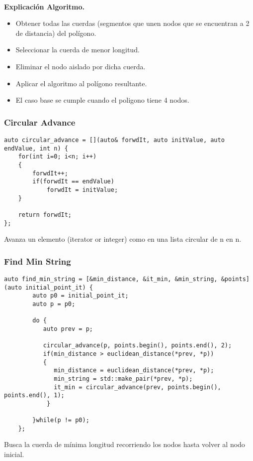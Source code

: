 \documentclass[compress]{beamer}
\begin{document}
\begin{frame}
	
	\textbf{\\Explicación Algoritmo.\\}
\begin{itemize}
	\item Obtener todas las cuerdas (segmentos que unen nodos que se encuentran a 2 de distancia) del polígono.
	\item Seleccionar la cuerda de menor longitud.
	\item Eliminar el nodo aislado por dicha cuerda.
	\item Aplicar el algoritmo al polígono resultante.
	
	\item El caso base se cumple cuando el poligono tiene 4 nodos.
\end{itemize}

\end{frame}	

\begin{frame}[fragile]
	\frametitle{Circular Advance}
 \begin{lstlisting}
auto circular_advance = [](auto& forwdIt, auto initValue, auto endValue, int n) {
	for(int i=0; i<n; i++)
	{
		forwdIt++;
		if(forwdIt == endValue)
			forwdIt = initValue;
	}

	return forwdIt;
};
 \end{lstlisting}
 
 Avanza un elemento (iterator or integer) como en una lista circular de n en n.
 
\end{frame}

\begin{frame}[fragile]
	\frametitle{Find Min String}
\begin{lstlisting}[basicstyle= \tiny,]
    auto find_min_string = [&min_distance, &it_min, &min_string, &points](auto initial_point_it) {
	    auto p0 = initial_point_it;
	    auto p = p0;
    
	    do {
		   auto prev = p;
    
		   circular_advance(p, points.begin(), points.end(), 2);
		   if(min_distance > euclidean_distance(*prev, *p))
		   {
		      min_distance = euclidean_distance(*prev, *p);
              min_string = std::make_pair(*prev, *p);
              it_min = circular_advance(prev, points.begin(), points.end(), 1);
            }
    
        }while(p != p0);
    };
\end{lstlisting}
	Busca la cuerda de mínima longitud recorriendo los nodos hasta volver al nodo inicial.
\end{frame}
\end{document}
